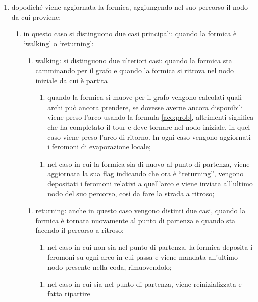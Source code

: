 \begin{enumerate}
    Nell'altro caso l'algoritmo continua normalmente;
    \item dopodiché viene aggiornata la formica, aggiungendo nel suo percorso il nodo da cui proviene;
    \begin{enumerate}
        \item in questo caso si distinguono due casi principali: quando la formica è `walking' o `returning':
        \begin{enumerate}
            \item walking: si distinguono due ulteriori casi: quando la formica sta camminando per il grafo e quando la formica si ritrova nel nodo iniziale da cui è partita
            \begin{enumerate}
                \item quando la formica si muove per il grafo vengono calcolati quali archi può ancora prendere, se dovesse averne ancora disponibili viene preso l'arco usando la formula \ref{aco:prob}, altrimenti significa che ha completato il tour e deve tornare nel nodo iniziale, in quel caso viene preso l'arco di ritorno. In ogni caso vengono aggiornati i feromoni di evaporazione locale;
            \end{enumerate}
            \begin{enumerate}
                \item nel caso in cui la formica sia di nuovo al punto di partenza, viene aggiornata la sua flag indicando che ora è ``returning'', vengono depositati i feromoni relativi a quell'arco e viene inviata all'ultimo nodo del suo percorso, così da fare la strada a ritroso;
            \end{enumerate}
        \end{enumerate}
        \begin{enumerate}
            \item returning: anche in questo caso vengono distinti due casi, quando la formica è tornata nuovamente al punto di partenza e quando sta facendo il percorso a ritroso:
            \begin{enumerate}
                \item nel caso in cui non sia nel punto di partenza, la formica deposita i feromoni su ogni arco in cui passa e viene mandata all'ultimo nodo presente nella coda, rimuovendolo;
            \end{enumerate}
            \begin{enumerate}
                \item nel caso in cui sia nel punto di partenza, viene reinizializzata e fatta ripartire

\end{enumerate}
\end{enumerate}
\end{enumerate}
\end{enumerate}
